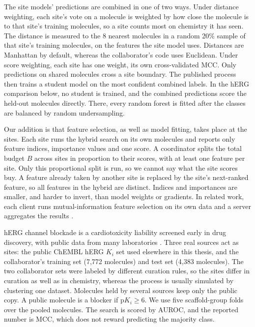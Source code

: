 The site models' predictions are combined in one of two ways. Under distance weighting, each site's vote on a molecule is weighted by how close the molecule is to that site's training molecules, so a site counts most on chemistry it has seen. The distance is measured to the 8 nearest molecules in a random 20\% sample of that site's training molecules, on the features the site model uses. Distances are Manhattan by default, whereas the collaborator's code uses Euclidean. Under score weighting, each site has one weight, its own cross-validated MCC. Only predictions on shared molecules cross a site boundary. The published process then trains a student model on the most confident combined labels. In the hERG comparison below, no student is trained, and the combined predictions score the held-out molecules directly. There, every random forest is fitted after the classes are balanced by random undersampling.

Our addition is that feature selection, as well as model fitting, takes place at the sites. Each site runs the hybrid search on its own molecules and reports only feature indices, importance values and one score. A coordinator splits the total budget $B$ across sites in proportion to their scores, with at least one feature per site. Only this proportional split is run, so we cannot say what the site scores buy. A feature already taken by another site is replaced by the site's next-ranked feature, so all features in the hybrid are distinct. Indices and importances are smaller, and harder to invert, than model weights or gradients. In related work, each client runs mutual-information feature selection on its own data and a server aggregates the results \citep{Cassara2022}.

hERG channel blockade is a cardiotoxicity liability screened early in drug discovery, with public data from many laboratories \citep{Czodrowski2013}. Three real sources act as sites: the public ChEMBL hERG $K_i$ set used elsewhere in this thesis, and the collaborator's training set (7,772 molecules) and test set (4,383 molecules). The two collaborator sets were labeled by different curation rules, so the sites differ in curation as well as in chemistry, whereas the process is usually simulated by clustering one dataset. Molecules held by several sources keep only the public copy. A public molecule is a blocker if $\mathrm{p}K_i \ge 6$. We use five scaffold-group folds over the pooled molecules. The search is scored by AUROC, and the reported number is MCC, which does not reward predicting the majority class.

